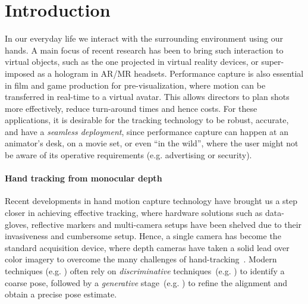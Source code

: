 \newpage
\section{Introduction}
In our everyday life we interact with the surrounding environment using our hands. A main focus of recent research has been to bring such interaction to virtual objects, such as the one projected in virtual reality devices, %
or super-imposed as a hologram in AR/MR headsets. 
Performance capture is also essential in film and game production for pre-visualization, where motion can be transferred in real-time to a virtual avatar. This allows directors to plan shots more effectively, reduce turn-around times and hence costs.
For these applications, it is desirable for the tracking technology to be robust, accurate, and have a \emph{seamless deployment}, since performance capture can happen at an animator's desk, on a movie set, or even ``in the wild'',  where the user might not be aware of its operative requirements (e.g. advertising or security).

\paragraph{Hand tracking from monocular depth}
Recent developments in hand motion capture technology have brought us a step closer in achieving effective tracking, where hardware solutions such as data-gloves, reflective markers and multi-camera setups have been shelved due to their invasiveness and cumbersome setup.
Hence, a single camera has become the standard acquisition device, where depth cameras  have taken a solid lead over color imagery to overcome the many challenges of hand-tracking~\cite{supancic2015depth}. 
Modern techniques (e.g. ) often rely on \emph{discriminative} techniques~(e.g. ) to identify a coarse pose, followed by a \emph{generative} stage~(e.g. ) to refine the alignment and obtain a precise pose estimate.



